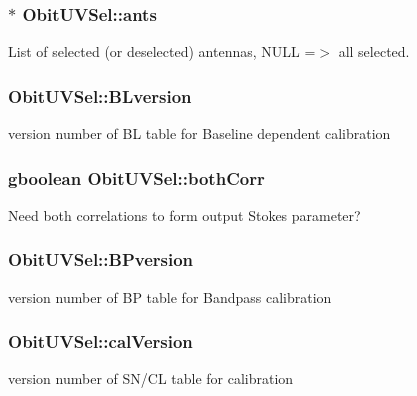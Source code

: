 \subsubsection{$\ast$ {\bf Obit\-UVSel::ants}}\label{structObitUVSel_o26}


List of selected (or deselected) antennas, NULL =$>$ all selected. 

\subsubsection{ {\bf Obit\-UVSel::BLversion}}\label{structObitUVSel_o37}


version number of BL table for Baseline dependent calibration 

\subsubsection{\setlength{\rightskip}{0pt plus 5cm}gboolean {\bf Obit\-UVSel::both\-Corr}}\label{structObitUVSel_o23}


Need both correlations to form output Stokes parameter? 

\subsubsection{ {\bf Obit\-UVSel::BPversion}}\label{structObitUVSel_o40}


version number of BP table for Bandpass calibration 

\subsubsection{ {\bf Obit\-UVSel::cal\-Version}}\label{structObitUVSel_o45}


version number of SN/CL table for calibration 

